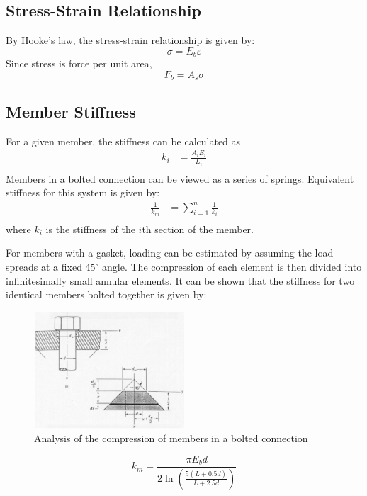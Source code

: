 \subsection{Stress-Strain Relationship}
By Hooke's law, the stress-strain relationship is given by:
\begin{equation}
    \sigma = E_b\varepsilon \label{eq:stress_strain}
\end{equation}
Since stress is force per unit area, 
\begin{equation}
    F_b = A_s\sigma \label{eq:force_area}
\end{equation}

\subsection{Member Stiffness}
For a given member, the stiffness can be calculated as 
\begin{align}
    k_i &= \frac{A_i E_i}{L_i} \label{eq:member_stiffness} \\
\end{align}
Members in a bolted connection can be viewed as a series of springs. Equivalent stiffness for this system is given by:
\begin{align}
    \frac{1}{k_m} &= \sum_{i=1}^{n} \frac{1}{k_i} \label{eq:member_stiffness_series} \\
\end{align}
where $k_i$ is the stiffness of the $i$th section of the member. 

For members with a gasket, loading can be estimated by assuming the load spreads at a fixed 45$^\circ$ angle. The compression of each element is then divided into infinitesimally small annular elements. It can be shown that the stiffness for two identical members bolted together is given by:
\begin{figure}[h]
    \centering
    \includegraphics[width=0.5\textwidth]{Sections/Figures/bolted connection gasket analysis.png}
    \caption{Analysis of the compression of members in a bolted connection}
    \label{fig:bolted_connection_gasket_analysis}
\end{figure}
\begin{equation}
    k_m = \frac{\pi E_b d}{2\ln\left(\frac{5(L+0.5d)}{L+2.5d}\right)} \label{eq:member_stiffness_theory}
\end{equation}

